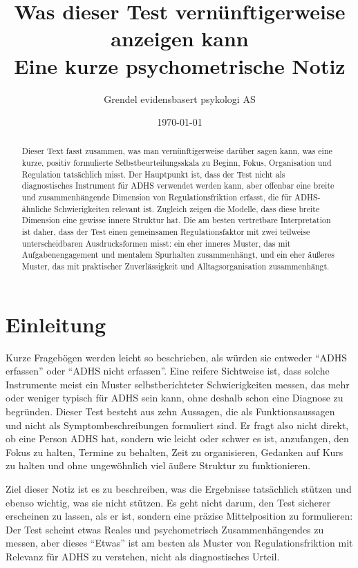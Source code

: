 \documentclass[11pt,a4paper]{article}
\title{Was dieser Test vernünftigerweise anzeigen kann\\
\large Eine kurze psychometrische Notiz}
\author{Grendel evidensbasert psykologi AS}
\date{\today}
\begin{document}
\maketitle

\begin{abstract}
Dieser Text fasst zusammen, was man vernünftigerweise darüber sagen kann, was eine kurze, positiv formulierte Selbstbeurteilungsskala zu Beginn, Fokus, Organisation und Regulation tatsächlich misst. Der Hauptpunkt ist, dass der Test nicht als diagnostisches Instrument für ADHS verwendet werden kann, aber offenbar eine breite und zusammenhängende Dimension von Regulationsfriktion erfasst, die für ADHS-ähnliche Schwierigkeiten relevant ist. Zugleich zeigen die Modelle, dass diese breite Dimension eine gewisse innere Struktur hat. Die am besten vertretbare Interpretation ist daher, dass der Test einen gemeinsamen Regulationsfaktor mit zwei teilweise unterscheidbaren Ausdrucksformen misst: ein eher inneres Muster, das mit Aufgabenengagement und mentalem Spurhalten zusammenhängt, und ein eher äußeres Muster, das mit praktischer Zuverlässigkeit und Alltagsorganisation zusammenhängt.
\end{abstract}

\section{Einleitung}
Kurze Fragebögen werden leicht so beschrieben, als würden sie entweder ``ADHS erfassen'' oder ``ADHS nicht erfassen''. Eine reifere Sichtweise ist, dass solche Instrumente meist ein Muster selbstberichteter Schwierigkeiten messen, das mehr oder weniger typisch für ADHS sein kann, ohne deshalb schon eine Diagnose zu begründen. Dieser Test besteht aus zehn Aussagen, die als Funktionsaussagen und nicht als Symptombeschreibungen formuliert sind. Er fragt also nicht direkt, ob eine Person ADHS hat, sondern wie leicht oder schwer es ist, anzufangen, den Fokus zu halten, Termine zu behalten, Zeit zu organisieren, Gedanken auf Kurs zu halten und ohne ungewöhnlich viel äußere Struktur zu funktionieren.

Ziel dieser Notiz ist es zu beschreiben, was die Ergebnisse tatsächlich stützen und ebenso wichtig, was sie nicht stützen. Es geht nicht darum, den Test sicherer erscheinen zu lassen, als er ist, sondern eine präzise Mittelposition zu formulieren: Der Test scheint etwas Reales und psychometrisch Zusammenhängendes zu messen, aber dieses ``Etwas'' ist am besten als Muster von Regulationsfriktion mit Relevanz für ADHS zu verstehen, nicht als diagnostisches Urteil.
\end{document}
